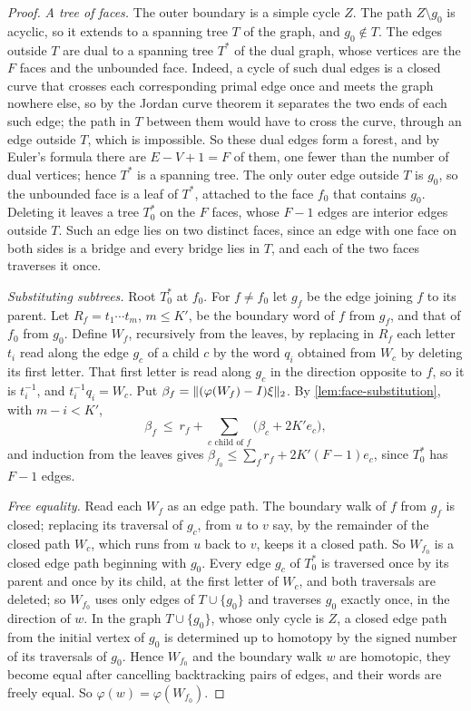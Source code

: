 \begin{proof}
\emph{A tree of faces.} The outer boundary is a simple cycle $Z$. The path $Z\setminus g_0$ is acyclic, so it extends to a
spanning tree $T$ of the graph, and $g_0\notin T$. The edges outside $T$ are dual to a spanning tree $T^*$ of the dual graph,
whose vertices are the $F$ faces and the unbounded face. Indeed, a cycle of such dual edges is a closed curve that crosses each
corresponding primal edge once and meets the graph nowhere else, so by the Jordan curve theorem it separates the two ends of each
such edge; the path in $T$ between them would have to cross the curve, through an edge outside $T$, which is impossible. So these
dual edges form a forest, and by Euler's formula there are $E-V+1=F$ of them, one fewer than the number of dual vertices; hence
$T^*$ is a spanning tree. The only outer edge outside $T$ is $g_0$, so the unbounded face is a leaf of $T^*$, attached to the face
$f_0$ that contains $g_0$. Deleting it leaves a tree $T^*_0$ on the $F$ faces, whose $F-1$ edges are interior edges outside $T$.
Such an edge lies on two distinct faces, since an edge with one face on both sides is a bridge and every bridge lies in $T$, and
each of the two faces traverses it once.

\emph{Substituting subtrees.} Root $T^*_0$ at $f_0$. For $f\ne f_0$ let $g_f$ be the edge joining $f$ to its parent. Let
$R_f=t_1\cdots t_m$, $m\le K'$, be the boundary word of $f$ from $g_f$, and that of $f_0$ from $g_0$. Define $W_f$, recursively
from the leaves, by replacing in $R_f$ each letter $t_i$ read along the edge $g_c$ of a child $c$ by the word $q_i$ obtained from
$W_c$ by deleting its first letter. That first letter is read along $g_c$ in the direction opposite to $f$, so it is $t_i^{-1}$,
and $t_i^{-1}q_i=W_c$. Put $\beta_f=\lVert (\varphi(W_f)-I)\xi\rVert_2$. By \cref{lem:face-substitution}, with $m-i<K'$,
\[
\beta_f\ \le\ r_f+\sum_{c\text{ child of }f}\bigl(\beta_c+2K'e_c\bigr),
\]
and induction from the leaves gives $\beta_{f_0}\le\sum_fr_f+2K'(F-1)e_c$, since $T^*_0$ has $F-1$ edges.

\emph{Free equality.} Read each $W_f$ as an edge path. The boundary walk of $f$ from $g_f$ is closed; replacing its traversal of
$g_c$, from $u$ to $v$ say, by the remainder of the closed path $W_c$, which runs from $u$ back to $v$, keeps it a closed path. So
$W_{f_0}$ is a closed edge path beginning with $g_0$. Every edge $g_c$ of $T^*_0$ is traversed once by its parent and once by its
child, at the first letter of $W_c$, and both traversals are deleted; so $W_{f_0}$ uses only edges of $T\cup\{g_0\}$ and traverses
$g_0$ exactly once, in the direction of $w$. In the graph $T\cup\{g_0\}$, whose only cycle is $Z$, a closed edge path from the
initial vertex of $g_0$ is determined up to homotopy by the signed number of its traversals of $g_0$. Hence $W_{f_0}$ and the
boundary walk $w$ are homotopic, they become equal after cancelling backtracking pairs of edges, and their words are freely equal.
So $\varphi(w)=\varphi(W_{f_0})$.
\end{proof}

